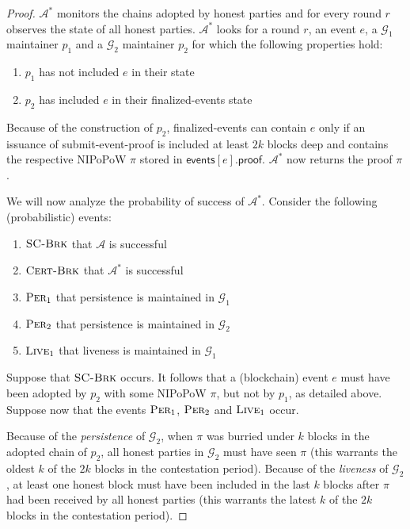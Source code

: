 \begin{proof}
  $\mathcal{A}^*$ monitors the chains adopted by honest parties and for every
  round $r$ observes the state of all honest parties. $\mathcal{A}^*$ looks for
  a round $r$, an event $e$, a $\mathcal{G}_1$ maintainer $p_1$ and a
  $\mathcal{G}_2$ maintainer $p_2$ for which the following properties hold:

  \begin{enumerate}
    \item $p_1$ has not included $e$ in their state
    \item $p_2$ has included $e$ in their \textsf{finalized-events} state
  \end{enumerate}

  Because of the construction of $p_2$, \textsf{finalized-events} can contain
  $e$ only if an issuance of \textsf{submit-event-proof} is included at least
  $2k$ blocks deep and contains the respective NIPoPoW $\pi$ stored in
  $\textsf{events}[e].\textsf{proof}$. $\mathcal{A}^*$ now returns the proof
  $\pi$.

  We will now analyze the probability of success of $\mathcal{A}^*$. Consider
  the following (probabilistic) events:

  \begin{enumerate}
    \item $\textsc{SC-Brk}$ that $\mathcal{A}$ is successful
    \item $\textsc{Cert-Brk}$ that $\mathcal{A}^*$ is successful
    \item $\textsc{Per}_1$ that persistence is maintained in $\mathcal{G}_1$
    \item $\textsc{Per}_2$ that persistence is maintained in $\mathcal{G}_2$
    \item $\textsc{Live}_1$ that liveness is maintained in $\mathcal{G}_1$
  \end{enumerate}

  Suppose that $\textsc{SC-Brk}$ occurs. It follows that a (blockchain) event
  $e$ must have been adopted by $p_2$ with some NIPoPoW $\pi$, but not by $p_1$,
  as detailed above. Suppose now that the events $\textsc{Per}_1$,
  $\textsc{Per}_2$ and $\textsc{Live}_1$ occur.

  Because of the \emph{persistence} of $\mathcal{G}_2$, when $\pi$ was burried
  under $k$ blocks in the adopted chain of $p_2$, all honest parties in
  $\mathcal{G}_2$ must have seen $\pi$ (this warrants the oldest $k$ of the $2k$
  blocks in the contestation period). Because of the \emph{liveness} of
  $\mathcal{G}_2$, at least one honest block must have been included in the last
  $k$ blocks after $\pi$ had been received by all honest parties (this warrants
  the latest $k$ of the $2k$ blocks in the contestation period).


\end{proof}
